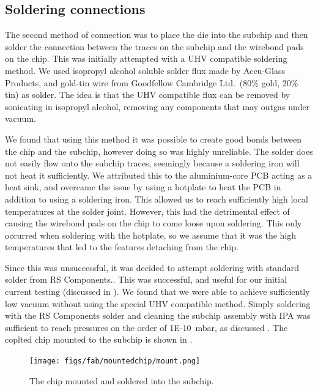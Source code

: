 \subsection{Soldering connections}
\label{fab:solder}

The second method of connection was to place the die into the subchip and then
solder the connection between the traces on the subchip and the wirebond pads
on the chip. This was initially attempted with a UHV compatible soldering
method. We used isopropyl alcohol soluble solder flux made by Accu-Glass
Products, and gold-tin wire from Goodfellow Cambridge Ltd.\ (80\% gold, 20\%
tin) as solder. The idea is that the UHV compatible flux can be removed by
sonicating in isopropyl alcohol, removing any components that may outgas under
vacuum.

We found that using this method it was possible to create good bonds between
the chip and the subchip, however doing so was highly unreliable. The solder
does not easily flow onto the subchip traces, seemingly because a soldering
iron will not heat it sufficiently. We attributed this to the aluminium-core
PCB acting as a heat sink, and overcame the issue by using a hotplate to heat
the PCB in addition to using a soldering iron. This allowed us to reach
sufficiently high  local temperatures at the solder joint.
%
However, this had the detrimental effect of causing the wirebond pads on the
chip to come loose upon soldering. This only occurred when soldering with the
hotplate, so we assume that it was the high temperatures that led to the
features detaching from the chip.

Since this was unsuccessful, it was decided to attempt soldering with standard
solder from RS Components.. This was successful, and useful for our initial current
testing (discussed in ). We found that we were able to
achieve sufficiently low vacuum without using the special UHV compatible
method. Simply soldering with the RS Components solder and cleaning the subchip
assembly with IPA was sufficient to reach pressures on the order of
\SI{1E-10}{\milli\bar}, as discussed . The coplted chip
mounted to the subchip is shown in .

\begin{figure}
  \centering
  \texttt{[image: figs/fab/mountedchip/mount.png]}
  \caption[A mounted chip]{The chip mounted and soldered into the subchip.}
  \label{fab:fig:mountedchip}
\end{figure}

